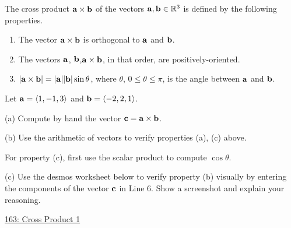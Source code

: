 \documentclass{ximera}
\begin{document}
The cross product ${\bf a}\times {\bf b}$ of the vectors ${\bf a},{\bf b}\in \mathbb{R}^3$ is defined by the following properties.

\begin{enumerate}
\item{The vector ${\bf a}\times {\bf b}$ is orthogonal to ${\bf a}$ and ${\bf b}$}.

\item{The vectors ${\bf a}$, ${\bf b}$,${\bf a}\times {\bf b}$, in that order, are positively-oriented.}

\item{$|{\bf a}\times {\bf b}| = |{\bf a}||{\bf b}| \sin\theta$, where $\theta$, $0\leq \theta \leq \pi$, is the angle between ${\bf a}$ and ${\bf b}$.}
\end{enumerate}


\begin{question} \label{Q98erg4323}
Let ${\bf a} = \langle 1, -1, 3 \rangle$ and ${\bf b}=\langle -2,2,1 \rangle$.

(a) Compute by hand the vector ${\bf c} = {\bf a}\times {\bf b}$.

(b) Use the arithmetic of vectors to verify properties (a), (c) above.

\begin{hint}
For property (c), first use the scalar product to compute $\cos\theta$.
\end{hint}

(c) Use the desmos worksheet below to verify property (b) visually by entering the components of the vector ${\bf c}$ in Line 6. Show a screenshot and explain your reasoning.



\begin{onlineOnly}
    \begin{center}
\end{center}
\end{onlineOnly}

\href{https://www.desmos.com/3d/jla3lweqrp}{163: Cross Product 1}

\end{question}

\end{document}
